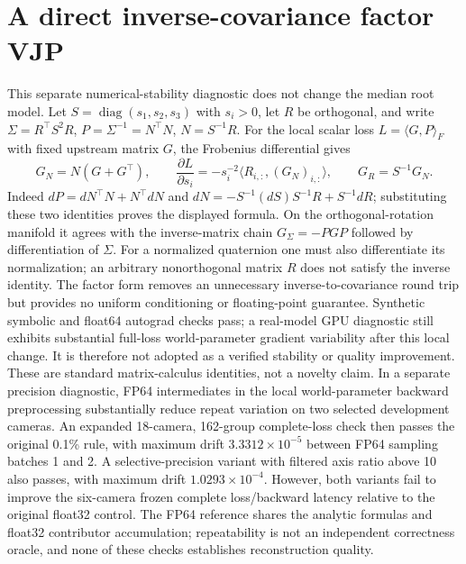 \documentclass[11pt,a4paper]{article}
\begin{document}
\section{A direct inverse-covariance factor VJP}
This separate numerical-stability diagnostic does not change the median
root model. Let $S=\operatorname{diag}(s_1,s_2,s_3)$ with $s_i>0$,
let $R$ be orthogonal, and write
$\Sigma=R^\top S^2R$, $P=\Sigma^{-1}=N^\top N$, $N=S^{-1}R$.
For the local scalar loss $L=\langle G,P\rangle_F$ with fixed upstream
matrix $G$, the Frobenius differential gives
\[
 G_N=N(G+G^\top),\qquad
 \frac{\partial L}{\partial s_i}
 =-s_i^{-2}\langle R_{i,:},(G_N)_{i,:}\rangle,\qquad
 G_R=S^{-1}G_N.
\]
Indeed $dP=dN^\top N+N^\top dN$ and
$dN=-S^{-1}(dS)S^{-1}R+S^{-1}dR$; substituting these two identities
proves the displayed formula. On the orthogonal-rotation manifold it
agrees with the inverse-matrix chain $G_\Sigma=-PGP$ followed by
differentiation of $\Sigma$. For a normalized quaternion one must
also differentiate its normalization; an arbitrary nonorthogonal
matrix $R$ does not satisfy the inverse identity.
The factor form removes an unnecessary inverse-to-covariance round
trip but provides no uniform conditioning or floating-point guarantee.
Synthetic symbolic and float64 autograd checks pass; a real-model
GPU diagnostic still exhibits substantial full-loss world-parameter
gradient variability after this local change. It is therefore not
adopted as a verified stability or quality improvement. These are
standard matrix-calculus identities, not a novelty claim.
In a separate precision diagnostic, FP64 intermediates in the local
world-parameter backward preprocessing substantially reduce repeat
variation on two selected development cameras. An expanded 18-camera,
162-group complete-loss check then passes the original 0.1\% rule,
with maximum drift $3.3312\times10^{-5}$ between FP64 sampling
batches 1 and 2. A selective-precision variant with filtered axis
ratio above 10 also passes, with maximum drift $1.0293\times10^{-4}$.
However, both variants fail to improve the six-camera frozen complete
loss/backward latency relative to the original float32 control.
The FP64 reference shares the analytic formulas and float32 contributor
accumulation; repeatability is not an independent correctness oracle,
and none of these checks establishes reconstruction quality.
\end{document}
